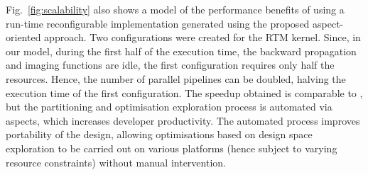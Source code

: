 Fig.~\ref{fig:scalability} also shows a model of the performance
benefits of using a run-time reconfigurable implementation generated
using the proposed aspect-oriented approach. Two configurations were
created for the RTM \FAST{} kernel. Since, in our model, during the
first half of the execution time, the backward propagation and imaging
functions are idle, the first configuration requires only half the
resources. Hence, the number of parallel pipelines can be doubled,
halving the execution time of the first configuration. The speedup
obtained is comparable to \cite{Xinyu:Qiwei:Luk:Qiang:Pell:2012}, but
the partitioning and optimisation exploration process is automated via
aspects, which increases developer productivity. The automated process
improves portability of the design, allowing optimisations based on
design space exploration to be carried out on various platforms (hence
subject to varying resource constraints) without manual intervention.


